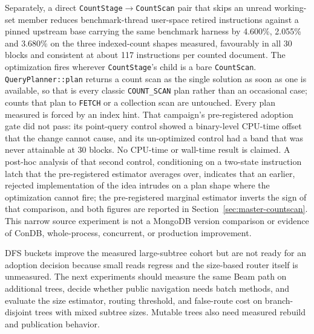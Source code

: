 \documentclass[10pt]{article}
\newcommand{\code}[1]{\texttt{#1}}
\begin{document}
Separately, a direct \code{CountStage}$\rightarrow$\code{CountScan} pair that
skips an unread working-set member reduces benchmark-thread user-space retired
instructions against a pinned upstream base carrying the same benchmark harness
by 4.600\%, 2.055\% and 3.680\% on the three indexed-count shapes measured,
favourably in all 30 blocks and consistent at about 117 instructions per counted
document. The optimization fires wherever \code{CountStage}'s child is a bare
\code{CountScan}. \code{QueryPlanner::plan} returns a count scan as the single
solution as soon as one is available, so that is every classic
\code{COUNT\_SCAN} plan rather than an occasional case; counts that plan to
\code{FETCH} or a collection scan are untouched. Every plan measured is forced
by an index hint. That campaign's pre-registered adoption gate did not pass: its
point-query control showed a binary-level CPU-time offset that the change cannot
cause, and its un-optimized control had a band that was never attainable at 30
blocks. No CPU-time or wall-time result is claimed. A post-hoc analysis of that
second control, conditioning on a two-state instruction latch that the
pre-registered estimator averages over, indicates that an earlier, rejected
implementation of the idea intrudes on a plan shape where the optimization
cannot fire; the pre-registered marginal estimator inverts the sign of that
comparison, and both figures are reported in
Section~\ref{sec:master-countscan}. This narrow source experiment is not a
MongoDB version comparison or evidence of ConDB, whole-process, concurrent, or
production improvement.

DFS buckets improve the measured large-subtree cohort but are not ready for an
adoption decision because small reads regress and the size-based router itself
is unmeasured. The next experiments should measure the same Beam path on
additional trees, decide whether public navigation needs batch methods, and
evaluate the size estimator, routing threshold, and false-route cost on
branch-disjoint trees with mixed subtree sizes. Mutable trees also need measured
rebuild and publication behavior.
\end{document}
